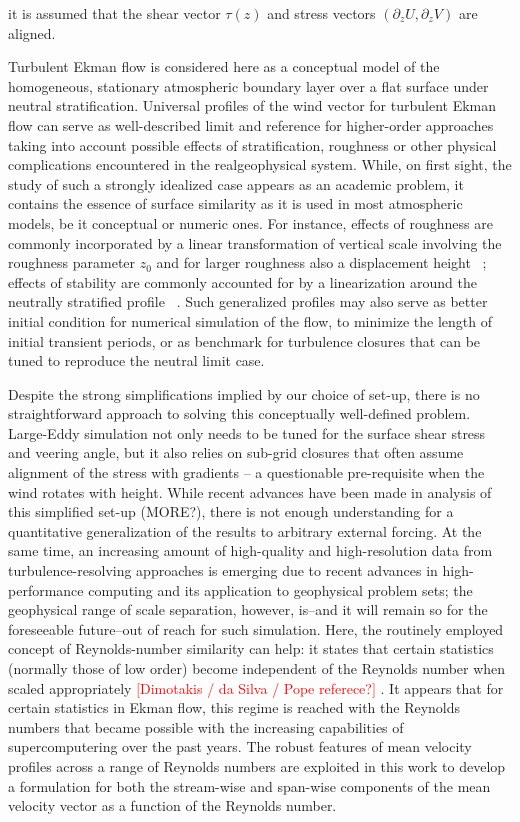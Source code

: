\documentclass[a4paper,11pt]{amsart}
\newcommand{\p}{\partial}
\newcommand{\todo}[1]{\textcolor{red}{$[$#1$]$}}
\begin{document}
it is assumed that the shear vector $\tau(z)$ and stress vectors $(\p_zU,\p_zV)$ are aligned. 
%
\par
%
Turbulent Ekman flow is considered here as a conceptual model of the
homogeneous, stationary atmospheric boundary layer over a flat surface under neutral stratification. 
%
Universal profiles of the wind vector for turbulent Ekman flow can serve as well-described limit and reference
for higher-order approaches taking into account possible effects of stratification, roughness or other physical
complications encountered in the realgeophysical system.
%
While, on first sight, the study of such a strongly idealized case appears as an academic problem, it contains the essence
of surface similarity as it is used in most atmospheric models, be it conceptual or numeric ones.
%
For instance, effects of roughness are commonly incorporated by a linear transformation of vertical scale involving the
roughness parameter $z_0$ and for larger roughness also a displacement height~%
\citep{monin:1975,jacobs:AFM1988,hogstrom:BM1988}; 
effects of stability are commonly accounted for by a linearization around the neutrally stratified profile~%
\citep{monin:ARF1970, monin:1975, hogstrom:BM1988, hogstrom:BM1996,sakagami:BM2020}.
%
Such generalized profiles may also serve as better initial condition for numerical simulation of the flow,
to minimize the length of initial transient periods, or as benchmark for turbulence
closures that can be tuned to reproduce the neutral limit case.
%
\par
%
Despite the strong simplifications implied by our choice of set-up, there is no straightforward approach to solving
this conceptually well-defined problem.
%
Large-Eddy simulation not only needs to be tuned for the surface shear stress and veering angle, but it also
relies on sub-grid closures that often assume alignment of the stress with gradients -- a questionable pre-requisite when the wind rotates with height.
%
While recent advances have been made in analysis of this simplified set-up \cite{jiang:JAS2018} (MORE?),
there is not enough understanding for a quantitative generalization of the results to arbitrary external forcing.
%
At the same time, an increasing amount of high-quality and high-resolution data from turbulence-resolving approaches
is emerging due to recent advances in high-performance computing and its application to geophysical problem sets;
the geophysical range of scale separation, however, is--and it will remain so for the foreseeable future--out of reach
for such simulation.
%
Here, the routinely employed concept of Reynolds-number similarity can help: it states that certain statistics (normally those of low order) become independent of the Reynolds number when scaled appropriately \todo{Dimotakis / da Silva / Pope referece?} .
%
It appears that for certain statistics in Ekman flow, this regime is reached with the Reynolds numbers that became
possible with the increasing capabilities of supercomputering over the past years.
%
The robust features of mean velocity profiles across a range of Reynolds numbers
are exploited in this work to develop a formulation for
both the stream-wise and span-wise components of the mean velocity vector as a function of the
Reynolds number. 
\end{document}
